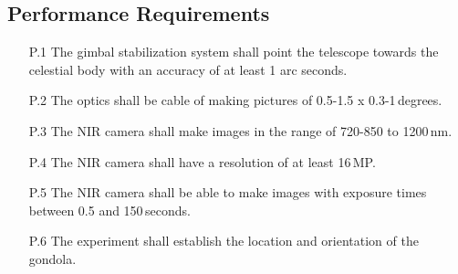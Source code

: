 \subsection{Performance Requirements}

\begin{enumerate}
    \item[P.1] The gimbal stabilization system shall point the telescope towards the celestial body with an accuracy of at least 1 arc seconds.
    \item[P.2] The optics shall be cable of making pictures of 0.5-1.5 x 0.3-1\,degrees.
    \item[P.3] The NIR camera shall make images in the range of 720-850 to 1200\,nm.
    \item[P.4] The NIR camera shall have a resolution of at least 16\,MP.
    \item[P.5] The NIR camera shall be able to make images with exposure times between 0.5 and 150\,seconds.
    \item[P.6] The experiment shall establish the location and orientation of the gondola.
\end{enumerate}